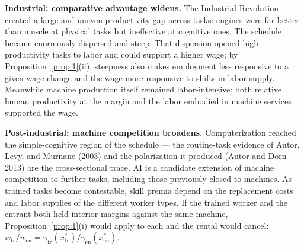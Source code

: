 \documentclass[12pt]{article}
\theoremstyle{plain}
\theoremstyle{definition}
\theoremstyle{remark}
\begin{document}
\textbf{Industrial: comparative advantage widens.} The Industrial Revolution created a large and uneven productivity gap across tasks: engines were far better than muscle at physical tasks but ineffective at cognitive ones. The schedule became enormously dispersed and steep. That dispersion opened high-productivity tasks to labor and could support a higher wage; by Proposition~\ref{prop:1}(ii), steepness also makes employment less responsive to a given wage change and the wage more responsive to shifts in labor supply. Meanwhile machine production itself remained labor-intensive: both relative human productivity at the margin and the labor embodied in machine services supported the wage.

\textbf{Post-industrial: machine competition broadens.} Computerization reached the simple-cognitive region of the schedule --- the routine-task evidence of Autor, Levy, and Murnane (2003) and the polarization it produced (Autor and Dorn 2013) are the cross-sectional trace. AI is a candidate extension of machine competition to further tasks, including those previously closed to machines. As trained tasks become contestable, skill premia depend on the replacement costs and labor supplies of the different worker types.
If the trained worker and the entrant both held interior margins against the same machine, Proposition~\ref{prop:1}(i) would apply to each and the rental would cancel: $w_{\mathrm{tr}}/w_{\mathrm{en}}=\gamma_{\mathrm{tr}}(x^*_{\mathrm{tr}})/\gamma_{\mathrm{en}}(x^*_{\mathrm{en}})$.

\end{document}
